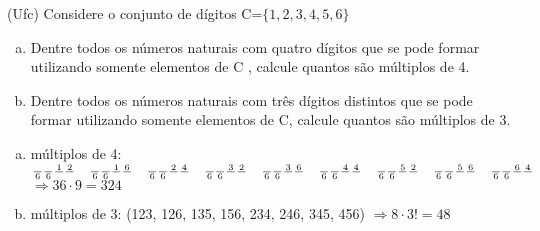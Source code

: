 \begin{ex}
(Ufc) Considere o conjunto de dígitos  C=$\{1, 2, 3, 4, 5, 6\}$
   \begin{enumerate}[(a)]
   \item Dentre todos os números naturais com quatro dígitos que se pode formar utilizando somente elementos de C , calcule quantos são múltiplos de 4.
   \item Dentre todos os números naturais com três dígitos distintos que se pode formar utilizando somente elementos de C, calcule quantos são múltiplos de 3.
   \end{enumerate}
     \begin{sol}
     \phantom{A}
         \begin{enumerate}  [(a)]
             \item múltiplos de 4:  \\
           $\frac{\phantom{A}}{6}\frac{\phantom{A}}{6}\frac{1}{\phantom{A}}\frac{2}{\phantom{A}}\hspace{0,4cm} \frac{\phantom{A}}{6}\frac{\phantom{A}}{6}\frac{1}{\phantom{A}}\frac{6}{\phantom{A}}\hspace{0,4cm} \frac{\phantom{A}}{6}\frac{\phantom{A}}{6}\frac{2}{\phantom{A}}\frac{4}{\phantom{A}}\hspace{0,4cm} \frac{\phantom{A}}{6}\frac{\phantom{A}}{6}\frac{3}{\phantom{A}}\frac{2}{\phantom{A}}\hspace{0,4cm}\frac{\phantom{A}}{6}\frac{\phantom{A}}{6}\frac{3}{\phantom{A}}\frac{6}{\phantom{A}}\hspace{0,4cm} \frac{\phantom{A}}{6}\frac{\phantom{A}}{6}\frac{4}{\phantom{A}}\frac{4}{\phantom{A}}\hspace{0,4cm} \frac{\phantom{A}}{6}\frac{\phantom{A}}{6}\frac{5}{\phantom{A}}\frac{2}{\phantom{A}}\hspace{0,4cm} \frac{\phantom{A}}{6}\frac{\phantom{A}}{6}\frac{5}{\phantom{A}}\frac{6}{\phantom{A}}\hspace{0,4cm}
           \frac{\phantom{A}}{6}\frac{\phantom{A}}{6}\frac{6}{\phantom{A}}\frac{4}{\phantom{A}} $ \\
           $\Longrightarrow 36\cdot9=324$
           \item múltiplos de 3: (123, 126, 135, 156, 234, 246, 345, 456) $\Longrightarrow 8\cdot3!=48$
        \end{enumerate} 
     \end{sol}
\end{ex}